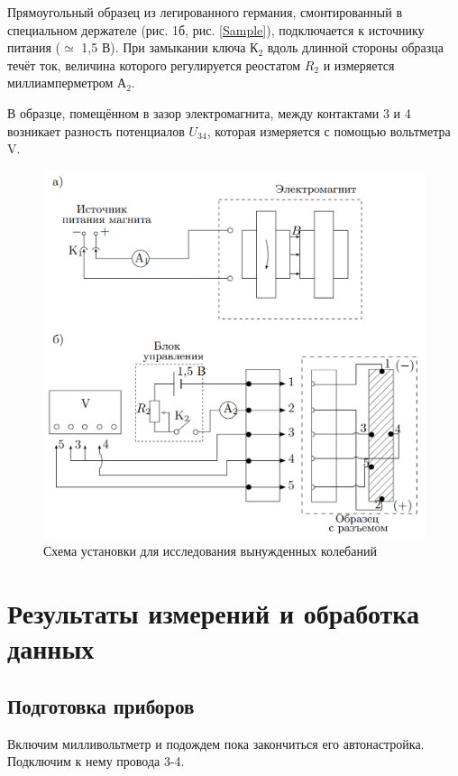 \documentclass[a4paper,12pt]{article}
\begin{document}
Прямоугольный образец из легированного германия, смонтированный в специальном держателе (рис. 1б, рис. \ref{Sample}), подключается к источнику питания ($\simeq$ 1,5 В). При замыкании ключа $К_2$ вдоль длинной стороны образца течёт ток, величина которого регулируется реостатом $R_2$ и измеряется миллиамперметром $А_2$.

В образце, помещённом в зазор электромагнита, между контактами 3 и 4 возникает разность потенциалов $U_{34}$, которая измеряется с помощью вольтметра V.

\begin{figure}[!h]
    \center
    \includegraphics[scale=0.6]{ust.png}
    \caption{Схема установки для исследования вынужденных колебаний}
    \label{ust}
\end{figure}


\section{Результаты измерений и обработка данных}

\subsection{Подготовка приборов}

Включим милливольтметр и подождем пока закончиться его автонастройка. Подключим к нему провода 3-4.
\end{document}
